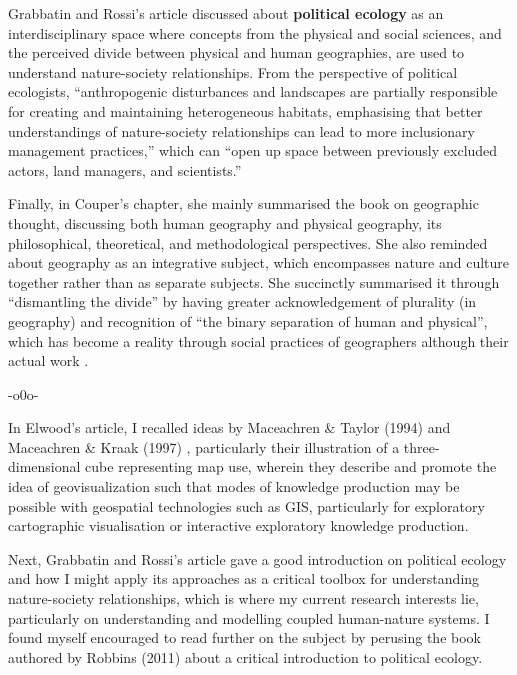 \documentclass[a4paper, 10.5pt]{article} %
\begin{document}
Grabbatin and Rossi's article discussed about \textbf{political ecology} as an interdisciplinary space where concepts from the physical and social sciences, and the perceived divide between physical and human geographies, are used to understand nature-society relationships. From the perspective of political ecologists, \enquote{anthropogenic disturbances and landscapes are partially responsible for creating and maintaining heterogeneous habitats, emphasising that better understandings of nature-society relationships can lead to more inclusionary management practices,} which can \enquote{open up space between previously excluded actors, land managers, and scientists.}

Finally, in Couper's chapter, she mainly summarised the book on geographic thought, discussing both human geography and physical geography, its philosophical, theoretical, and methodological perspectives. She also reminded about geography as an integrative subject, which encompasses nature and culture together rather than as separate subjects. She succinctly summarised it through \enquote{dismantling the divide} by having greater acknowledgement of plurality (in geography) and recognition of \enquote{the binary separation of human and physical}, which has become a reality through social practices of geographers although their actual work .

\begin{center}
-o0o-
\end{center}

In Elwood's article, I recalled ideas by Maceachren & Taylor (1994) \cite{maceachren_taylor_1994} and Maceachren & Kraak (1997) \cite{maceachren_kraak_1997}, particularly their illustration of a three-dimensional cube representing map use, wherein they describe and promote the idea of geovisualization such that modes of knowledge production may be possible with geospatial technologies such as GIS, particularly for exploratory cartographic visualisation or interactive exploratory knowledge production.

Next, Grabbatin and Rossi's article gave a good introduction on political ecology and how I might apply its approaches as a critical toolbox for understanding nature-society relationships, which is where my current research interests lie, particularly on understanding and modelling coupled human-nature systems. I found myself encouraged to read further on the subject by perusing the book authored by Robbins (2011) \cite{robbins_2011} about a critical introduction to political ecology.
\end{document}
